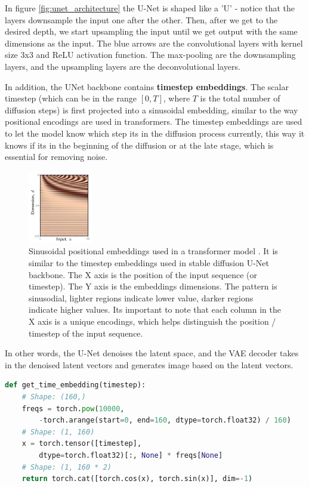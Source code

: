 In figure \ref{fig:unet_architecture} the U-Net is shaped like a 'U' - notice that the layers downsample the input one after the other. Then, after we get to the desired depth, we start upsampling the input until we get output with the same dimensions as the input. The blue arrows are the convolutional layers with kernel size 3x3 and ReLU activation function. The max-pooling are the downsampling layers, and the upsampling layers are the deconvolutional layers.

In addition, the UNet backbone contains \textbf{timestep embeddings}. The scalar timestep (which can be in the range $[0, T]$, where $T$ is the total number of diffusion steps) is first projected into a sinusoidal embedding, similar to the way positional encodings are used in transformers. The timestep embeddings are used to let the model know which step its in the diffusion process currently, this way it knows if its in the beginning of the diffusion or at the late stage, which is essential for removing noise.

\begin{figure}[h]
    \centering
    \includegraphics[width=0.25\textwidth]{images/diffusion_models/stable_diffusion/positional_encodings.png}
    \caption{Sinusoidal positional embeddings used in a transformer model \cite{understanding_deep_learning_book_2024}. It is similar to the timestep embeddings used in stable diffusion U-Net backbone. The X axis is the position of the input sequence (or timestep). The Y axis is the embeddings dimensions. The pattern is sinusodial, lighter regions indicate lower value, darker regions indicate higher values. Its important to note that each column in the X axis is a unique encodings, which helps distinguish the position / timestep of the input sequence.}
\end{figure}

In other words, the U-Net denoises the latent space, and the VAE decoder takes in the denoised latent vectors and generates image based on the latent vectors.

\begin{lstlisting}[language=Python, caption={Timestep embeddings of Stable Diffusion pipeline. We convert the timestep to sinusoidal vector embedding.}, label={lst:timestep_embeddings_stable_diffusion}]
def get_time_embedding(timestep):
    # Shape: (160,)
    freqs = torch.pow(10000, 
        -torch.arange(start=0, end=160, dtype=torch.float32) / 160) 
    # Shape: (1, 160)
    x = torch.tensor([timestep], 
        dtype=torch.float32)[:, None] * freqs[None]
    # Shape: (1, 160 * 2)
    return torch.cat([torch.cos(x), torch.sin(x)], dim=-1)
\end{lstlisting}

